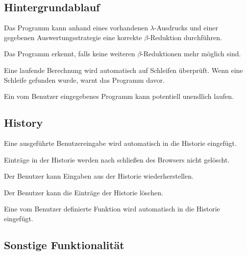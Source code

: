 \documentclass[parskip=full,11pt,twoside]{scrartcl}
\begin{document}
\subsection{Hintergrundablauf}

Das Programm kann anhand eines vorhandenen $\lambda$-Ausdrucks und einer gegebenen Auswertungsstrategie eine korrekte $\beta$-Reduktion durchführen.

Das Programm erkennt, falls keine weiteren $\beta$-Reduktionen mehr möglich sind.

Eine laufende Berechnung wird automatisch auf Schleifen überprüft. Wenn eine Schleife gefunden wurde, warnt das Programm davor.

Ein vom Benutzer eingegebenes Programm kann potentiell unendlich laufen.




\subsection{History}

Eine ausgeführte Benutzereingabe wird automatisch in die Historie eingefügt.

Einträge in der Historie werden nach schließen des Browsers nicht gelöscht.

Der Benutzer kann Eingaben aus der Historie wiederherstellen.

Der Benutzer kann die Einträge der Historie löschen.

Eine vom Benutzer definierte Funktion wird automatisch in die Historie eingefügt.




\subsection{Sonstige Funktionalität}
\end{document}
